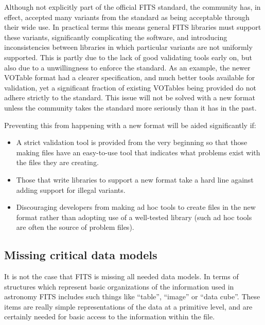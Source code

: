 \documentclass[final,authoryear,5p,times,twocolumn]{elsarticle}
\begin{document}
Although not explicitly part of the official FITS standard, the
community has, in effect, accepted many variants from the standard as
being acceptable through their wide use. In practical terms this means
general FITS libraries must support these variants, significantly
complicating the software, and introducing inconsistencies between
libraries in which particular variants are not uniformly
supported. This is partly due to the lack of good validating tools
early on, but also due to a unwillingness to enforce the standard. As
an example, the newer VOTable format \citep{2004tivo.conf..118O} had a
clearer specification, and much better tools available for validation,
yet a significant fraction of existing VOTables being provided do not
adhere strictly to the standard. This issue will not be solved with a
new format unless the community takes the standard more seriously than
it has in the past.


Preventing this from happening with a new format will be aided significantly if:

\begin{itemize}
\item A strict validation tool is provided from the very beginning so that
those making files have an easy-to-use tool that indicates what
problems exist with the files they are creating.

\item Those that write libraries to support a new format take a hard line
against adding support for illegal variants.

\item Discouraging developers from making ad hoc tools to create files in
the new format rather than adopting use of a well-tested library (such
ad hoc tools are often the source of problem files).
\end{itemize}

\subsection{Missing critical data models}


It is not the case that FITS is missing all needed data models. In
terms of structures which represent basic organizations of the
information used in astronomy FITS includes such things like ``table'',
``image'' or ``data cube''. These items are really simple representations
of the data at a primitive level, and are certainly needed for basic
access to the information within the file.
\end{document}
